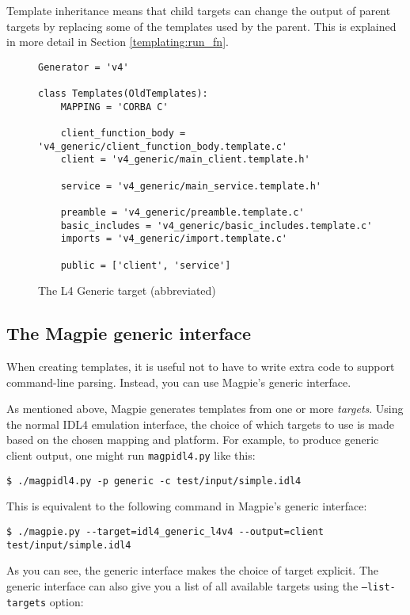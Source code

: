 Template inheritance means that child targets can change the output of parent targets by replacing some of the templates used by the parent. This is explained in more detail in Section \ref{templating:run_fn}.

\begin{figure}
\begin{verbatim}
Generator = 'v4'

class Templates(OldTemplates):
    MAPPING = 'CORBA C'

    client_function_body = 'v4_generic/client_function_body.template.c'
    client = 'v4_generic/main_client.template.h'

    service = 'v4_generic/main_service.template.h'

    preamble = 'v4_generic/preamble.template.c'
    basic_includes = 'v4_generic/basic_includes.template.c'
    imports = 'v4_generic/import.template.c'
    
    public = ['client', 'service']
\end{verbatim}
\caption{The L4 Generic target (abbreviated)}
\label{fig:templates:target:generic}
\end{figure}

\subsection{The Magpie generic interface}
When creating templates, it is useful not to have to write extra code to support command-line parsing. Instead, you can use Magpie's generic interface.

As mentioned above, Magpie generates templates from one or more {\em targets}. Using the normal IDL4 emulation interface, the choice of which targets to use is made based on the chosen mapping and platform. For example, to produce generic client output, one might run {\tt magpidl4.py} like this:

\begin{verbatim}
$ ./magpidl4.py -p generic -c test/input/simple.idl4
\end{verbatim}

This is equivalent to the following command in Magpie's generic interface:

\begin{verbatim}
$ ./magpie.py --target=idl4_generic_l4v4 --output=client test/input/simple.idl4
\end{verbatim}

As you can see, the generic interface makes the choice of target explicit. The generic interface can also give you a list of all available targets using the {\tt --list-targets} option:

